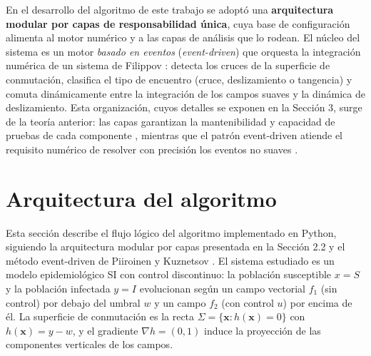 \documentclass[12pt,letterpaper]{article}
\begin{document}
En el desarrollo del algoritmo de este trabajo se adoptó una \textbf{arquitectura modular por capas de responsabilidad única}, cuya base de configuración alimenta al motor numérico y a las capas de análisis que lo rodean. El núcleo del sistema es un motor \emph{basado en eventos} (\emph{event-driven}) que orquesta la integración numérica de un sistema de Filippov \cite{piiroinen2008event}: detecta los cruces de la superficie de conmutación, clasifica el tipo de encuentro (cruce, deslizamiento o tangencia) y comuta dinámicamente entre la integración de los campos suaves y la dinámica de deslizamiento. Esta organización, cuyos detalles se exponen en la Sección 3, surge de la teoría anterior: las capas garantizan la mantenibilidad y capacidad de pruebas de cada componente \cite{bass2021sia,buschmann1996posa}, mientras que el patrón event-driven atiende el requisito numérico de resolver con precisión los eventos no suaves \cite{piiroinen2008event}.

\section{Arquitectura del algoritmo}
Esta sección describe el flujo lógico del algoritmo implementado en Python, siguiendo la arquitectura modular por capas presentada en la Sección 2.2 y el método event-driven de Piiroinen y Kuznetsov \cite{piiroinen2008event}. El sistema estudiado es un modelo epidemiológico SI con control discontinuo: la población susceptible $x = S$ y la población infectada $y = I$ evolucionan según un campo vectorial $f_1$ (sin control) por debajo del umbral $w$ y un campo $f_2$ (con control $u$) por encima de él. La superficie de conmutación es la recta $\Sigma = \{\mathbf{x} : h(\mathbf{x}) = 0\}$ con $h(\mathbf{x}) = y - w$, y el gradiente $\nabla h = (0,1)$ induce la proyección de las componentes verticales de los campos.
\end{document}
